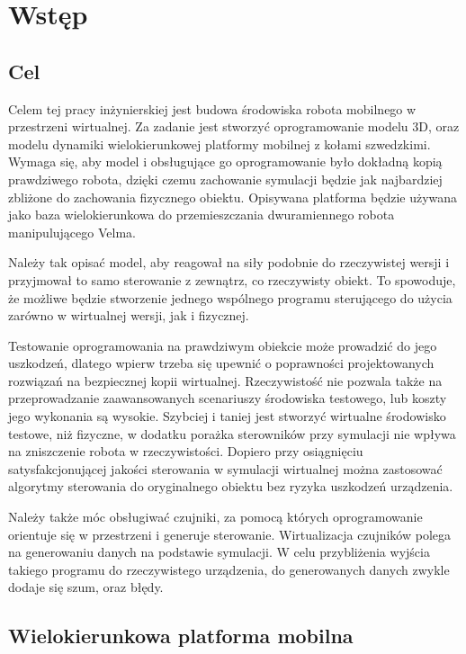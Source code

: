 \chapter{Wstęp}
\section{Cel}
Celem tej pracy inżynierskiej jest budowa środowiska robota mobilnego w przestrzeni wirtualnej.
Za zadanie jest stworzyć oprogramowanie modelu 3D, oraz modelu dynamiki wielokierunkowej platformy mobilnej z kołami szwedzkimi. 
Wymaga się, aby model i obsługujące go oprogramowanie było dokładną kopią prawdziwego robota, dzięki czemu zachowanie symulacji będzie jak najbardziej zbliżone do zachowania fizycznego obiektu.
Opisywana platforma będzie używana jako baza wielokierunkowa do przemieszczania dwuramiennego robota manipulującego Velma.

Należy tak opisać model, aby reagował na siły podobnie do rzeczywistej wersji i przyjmował to samo sterowanie z zewnątrz, co rzeczywisty obiekt.
To spowoduje, że możliwe będzie stworzenie jednego wspólnego programu sterującego do użycia zarówno w wirtualnej wersji, jak i fizycznej.

Testowanie oprogramowania na prawdziwym obiekcie może prowadzić do jego uszkodzeń, dlatego wpierw trzeba się upewnić o poprawności projektowanych rozwiązań na bezpiecznej kopii wirtualnej.
Rzeczywistość nie pozwala także na przeprowadzanie zaawansowanych scenariuszy środowiska testowego, lub koszty jego wykonania są wysokie.
Szybciej i taniej jest stworzyć wirtualne środowisko testowe, niż fizyczne, w dodatku porażka sterowników przy symulacji nie wpływa na zniszczenie robota w rzeczywistości.
Dopiero przy osiągnięciu satysfakcjonującej jakości sterowania w symulacji wirtualnej można zastosować algorytmy sterowania do oryginalnego obiektu bez ryzyka uszkodzeń urządzenia.

Należy także móc obsługiwać czujniki, za pomocą których oprogramowanie orientuje się w przestrzeni i generuje sterowanie.
Wirtualizacja czujników polega na generowaniu danych na podstawie symulacji.
W celu przybliżenia wyjścia takiego programu do rzeczywistego urządzenia, do generowanych danych zwykle dodaje się szum, oraz błędy.

\section{Wielokierunkowa platforma mobilna}

